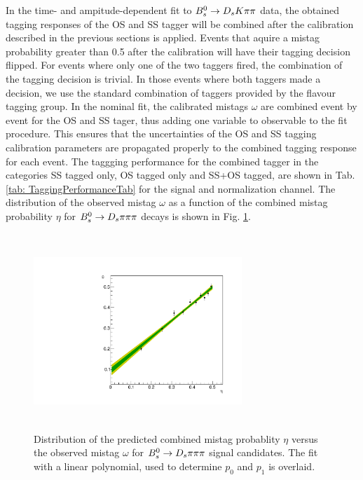 In the time- and ampitude-dependent fit to ${{B}^0_{s}}\rightarrow{\ensuremath{{D}_{s}}}{\ensuremath{K}}{\ensuremath{\pi}}{\ensuremath{\pi}}$ data, the obtained tagging responses of the OS and SS tagger will be combined after the calibration described in the previous sections is applied.
Events that aquire a mistag probability greater than 0.5 after the calibration will have their tagging decision flipped. For events where only one of the two taggers fired, the combination of the tagging decision is trivial.
In those events where both taggers made a decision, we use the standard combination of taggers \cite{LHCb-PAPER-2011-027} provided by the flavour tagging group. 
In the nominal fit, the calibrated mistags $\omega$ are combined event by event for the OS and SS tager, thus adding one variable to observable to the fit procedure. 
This ensures that the uncertainties of the OS and SS tagging calibration parameters are propagated properly to the combined tagging response for each event. \newline
The taggging performance for the combined tagger in the categories SS tagged only, OS tagged only and SS+OS tagged, are shown in Tab. \ref{tab: TaggingPerformanceTab} for the signal and normalization channel.
The distribution of the observed mistag $\omega$ as a function of the combined mistag probability $\eta$ for ${{B}^0_{s}}\rightarrow{\ensuremath{{D}_{s}}}{\ensuremath{\pi}}{\ensuremath{\pi}}{\ensuremath{\pi}}$ decays is shown in Fig. \ref{fig:TaggingCombinationCalibration}.


\begin{figure}[h]
\centering
\includegraphics[height=7.4cm,width=0.7\textwidth]{figs/Tagging/TaggingCombinationCalibration.pdf}
\caption{Distribution of the predicted combined mistag probablity $\eta$ versus the observed mistag $\omega$ for ${{B}^0_{s}}\rightarrow{\ensuremath{{D}_{s}}}{\ensuremath{\pi}}{\ensuremath{\pi}}{\ensuremath{\pi}}$ signal candidates. 
The fit with a linear polynomial, used to determine $p_{0}$ and $p_{1}$ is overlaid.}
\label{fig:TaggingCombinationCalibration}
\end{figure}


